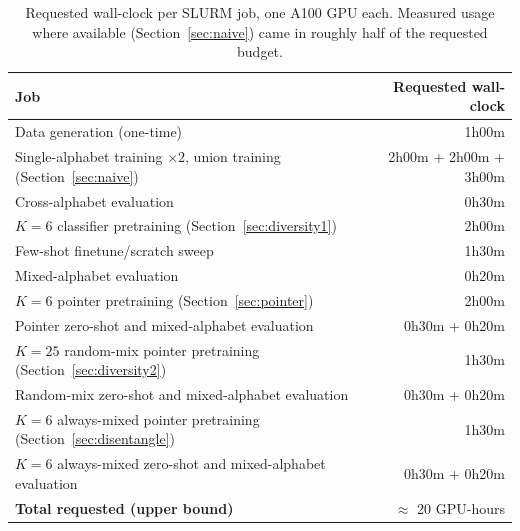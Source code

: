 \documentclass{article} %
\begin{document}
\begin{table}[h]
\centering
\small
\begin{tabular}{lr}
\hline
Job & Requested wall-clock \\
\hline
Data generation (one-time) & 1h00m \\
Single-alphabet training $\times 2$, union training (Section~\ref{sec:naive}) & 2h00m + 2h00m + 3h00m \\
Cross-alphabet evaluation & 0h30m \\
$K{=}6$ classifier pretraining (Section~\ref{sec:diversity1}) & 2h00m \\
Few-shot finetune/scratch sweep & 1h30m \\
Mixed-alphabet evaluation & 0h20m \\
$K{=}6$ pointer pretraining (Section~\ref{sec:pointer}) & 2h00m \\
Pointer zero-shot and mixed-alphabet evaluation & 0h30m + 0h20m \\
$K{=}25$ random-mix pointer pretraining (Section~\ref{sec:diversity2}) & 1h30m \\
Random-mix zero-shot and mixed-alphabet evaluation & 0h30m + 0h20m \\
$K{=}6$ always-mixed pointer pretraining (Section~\ref{sec:disentangle}) & 1h30m \\
$K{=}6$ always-mixed zero-shot and mixed-alphabet evaluation & 0h30m + 0h20m \\
\hline
\textbf{Total requested (upper bound)} & $\approx$ 20 GPU-hours \\
\hline
\end{tabular}
\caption{Requested wall-clock per SLURM job, one A100 GPU each. Measured
usage where available (Section~\ref{sec:naive}) came in roughly half of
the requested budget.}
\label{tab:compute}
\end{table}
\end{document}
